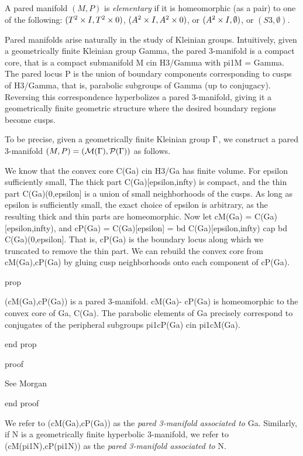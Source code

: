 \begin{defn}

A pared manifold $(M,P)$ is \emph{elementary} if it is homeomorphic (as a pair)
to one of the following: $(T^2\times I,T^2\times 0)$, $(A^2\times I,A^2\times 0)$, or $(A^2\times
I,\emptyset)$, or $(S3,\emptyset)$.

\end{defn}

Pared manifolds arise naturally in the study of Kleinian groups. Intuitively,
given a geometrically finite Kleinian group Gamma, the pared 3-manifold is
a compact core, that is a compact submanifold M cin H3/Gamma with pi1M = Gamma.
The pared locus P is the union of boundary components corresponding to cusps of
H3/Gamma, that is, parabolic subgroups of Gamma (up to conjugacy). Reversing
this correspondence hyperbolizes a pared 3-manifold, giving it a geometrically
finite geometric structure where the desired boundary regions become cusps.

To be precise, given a geometrically finite Kleinian group $\Gamma$, we construct
a pared 3-manifold $(M,P)=(\mathcal{M}(\Gamma),\mathcal{P}(\Gamma))$ as follows.

We know that the convex core C(Ga) cin H3/Ga has finite volume. For epsilon
sufficiently small, The thick part C(Ga)[epsilon,infty) is compact, and the
thin part C(Ga)(0,epsilon] is a union of small neighborhoods of the cusps.  As
long as epsilon is sufficiently small, the exact choice of epsilon is
arbitrary, as the resulting thick and thin parts are homeomorphic. Now let
cM(Ga) = C(Ga)[epsilon,infty), and cP(Ga) = C(Ga)[epsilon] = bd
C(Ga)[epsilon,infty) cap bd C(Ga)(0,epsilon]. That is, cP(Ga) is the boundary
locus along which we truncated to remove the thin part. We can rebuild the
convex core from cM(Ga),cP(Ga) by gluing cusp neighborhoods onto each component
of cP(Ga).

prop

(cM(Ga),cP(Ga)) is a pared 3-manifold. cM(Ga)- cP(Ga) is homeomorphic to the
convex core of Ga, C(Ga). The parabolic elements of Ga precisely correspond to
conjugates of the peripheral subgroups pi1cP(Ga) cin pi1cM(Ga).

end prop

proof

See Morgan %

end proof

We refer to (cM(Ga),cP(Ga)) as the \emph{pared 3-manifold associated to} Ga.
Similarly, if N is a geometrically finite hyperbolic 3-manifold, we refer to
(cM(pi1N),cP(pi1N)) as the \emph{pared 3-manifold associated to} N.

